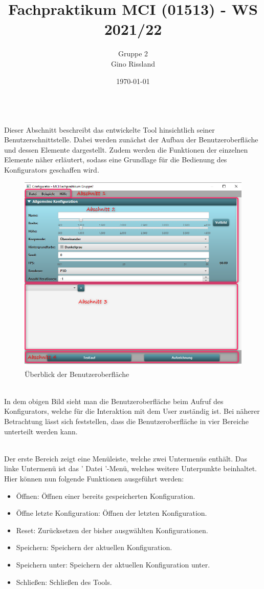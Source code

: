 \documentclass[../mciAusarbeitung.tex]{subfiles}
\title{Fachpraktikum MCI (01513) - WS 2021/22}
\author{Gruppe 2\\
	Gino Rissland}
\date{\today}
\begin{document}
$~$ \\Dieser Abschnitt beschreibt das entwickelte Tool hinsichtlich seiner Benutzerschnittstelle. Dabei werden zunächst der Aufbau der Benutzeroberfläche und dessen Elemente dargestellt. Zudem werden die Funktionen der einzelnen Elemente näher erläutert, sodass eine Grundlage für die Bedienung des Konfigurators geschaffen wird.
		
\begin{figure}[H]
\centering
            \includegraphics[width=0.5\linewidth]{"gino/all.png"}

\caption{Überblick der Benutzeroberfläche}
\end{figure}            
		
		$~$ \\In dem obigen Bild sieht man die Benutzeroberfläche beim Aufruf des Konfigurators, welche für die Interaktion mit dem User zuständig ist. Bei näherer Betrachtung lässt sich feststellen, dass die Benutzeroberfläche in vier Bereiche unterteilt werden kann.
		
		$~$ \\Der erste Bereich zeigt eine Menüleiste, welche zwei Untermenüs enthält.
		Das linke Untermenü ist das ' Datei '-Menü, welches weitere Unterpunkte beinhaltet. Hier können nun folgende Funktionen ausgeführt werden:
		
		\begin{itemize}
            \item Öffnen: Öffnen einer bereits gespeicherten Konfiguration.
			\item Öffne letzte Konfiguration: Öffnen der letzten Konfiguration.
			\item Reset: Zurücksetzen der bisher ausgwählten Konfigurationen.
            \item Speichern: Speichern der aktuellen Konfiguration.
            \item Speichern unter: Speichern der aktuellen Konfiguration unter.
            \item Schließen: Schließen des Tools.
        \end{itemize}
        
\end{document}
